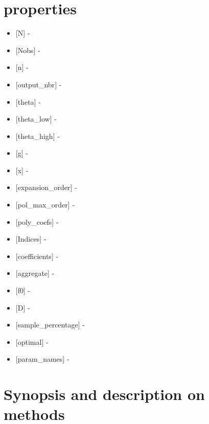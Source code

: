 \documentclass[letterpaper,10pt,english]{sphinxmanual}
\begin{document}
\section{properties}
\label{classes/utils/@hdmr/hdmr:properties}\begin{itemize}
\item {} 
{[}N{]} -

\item {} 
{[}Nobs{]} -

\item {} 
{[}n{]} -

\item {} 
{[}output\_nbr{]} -

\item {} 
{[}theta{]} -

\item {} 
{[}theta\_low{]} -

\item {} 
{[}theta\_high{]} -

\item {} 
{[}g{]} -

\item {} 
{[}x{]} -

\item {} 
{[}expansion\_order{]} -

\item {} 
{[}pol\_max\_order{]} -

\item {} 
{[}poly\_coefs{]} -

\item {} 
{[}Indices{]} -

\item {} 
{[}coefficients{]} -

\item {} 
{[}aggregate{]} -

\item {} 
{[}f0{]} -

\item {} 
{[}D{]} -

\item {} 
{[}sample\_percentage{]} -

\item {} 
{[}optimal{]} -

\item {} 
{[}param\_names{]} -

\end{itemize}


\section{Synopsis and description on methods}
\label{classes/utils/@hdmr/hdmr:synopsis-and-description-on-methods}
\end{document}
